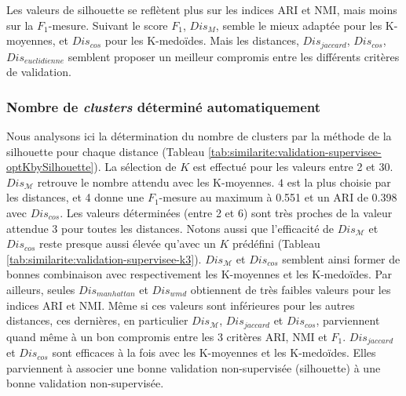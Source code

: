 Les valeurs de silhouette se reflètent plus sur les indices ARI et NMI, mais moins sur la $F_1$-mesure. Suivant le score $F_1$, $Dis_M$, semble le mieux adaptée pour les K-moyennes, et $Dis_{cos}$ pour les K-medoïdes. Mais les distances, $Dis_{jaccard}$, $Dis_{cos}$, $Dis_{euclidienne}$ semblent proposer un meilleur compromis entre les différents critères de validation.


\subsubsection{Nombre de \textit{clusters} déterminé automatiquement}
Nous analysons ici  la détermination du nombre de clusters par la méthode de la silhouette pour chaque distance (Tableau \ref{tab:similarite:validation-supervisee-optKbySilhouette}). La sélection de $K$ est effectué pour les valeurs entre 2 et 30. $Dis_\mathcal{M}$ retrouve le nombre attendu avec les K-moyennes. $4$ est la plus choisie par les distances, et 4 donne une $F_1$-mesure au maximum à 0.551 et un ARI de 0.398 avec $Dis_{cos}$. Les valeurs déterminées (entre 2 et 6) sont très proches de la valeur attendue 3 pour toutes les distances.  Notons aussi que l'efficacité de $Dis_\mathcal{M}$ et $Dis_{cos}$ reste presque aussi élevée qu'avec un $K$ prédéfini (Tableau \ref{tab:similarite:validation-supervisee-k3}). $Dis_\mathcal{M}$ et $Dis_{cos}$ semblent ainsi former de bonnes combinaison avec respectivement les K-moyennes et les K-medoïdes. Par ailleurs, seules $Dis_{manhattan}$ et $Dis_{wmd}$ obtiennent de très faibles valeurs pour les indices ARI et NMI. Même si ces valeurs sont inférieures pour les autres distances, ces dernières, en particulier $Dis_\mathcal{M}$, $Dis_{jaccard}$ et $Dis_{cos}$, parviennent quand même à un bon compromis entre les 3 critères ARI, NMI et $F_1$. $Dis_{jaccard}$ et $Dis_{cos}$ sont efficaces à la fois avec les K-moyennes et les K-medoïdes. Elles parviennent à associer une bonne validation non-supervisée (silhouette) à une bonne validation non-supervisée.


